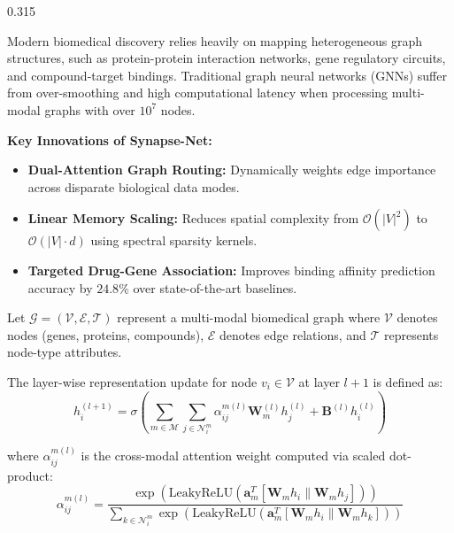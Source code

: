 \documentclass[final]{beamer}
\begin{document}
\begin{frame}[t]
\begin{columns}[t]
\begin{column}{0.315\textwidth}
    \begin{tcolorbox}[posterblock, title=\faFile\ Executive Summary]
      \large
      Modern biomedical discovery relies heavily on mapping heterogeneous graph structures, such as protein-protein interaction networks, gene regulatory circuits, and compound-target bindings. Traditional graph neural networks (GNNs) suffer from over-smoothing and high computational latency when processing multi-modal graphs with over $10^7$ nodes.

      \vspace{8pt}
      \textbf{Key Innovations of Synapse-Net:}
      \begin{itemize}
        \item \textbf{Dual-Attention Graph Routing:} Dynamically weights edge importance across disparate biological data modes.
        \item \textbf{Linear Memory Scaling:} Reduces spatial complexity from $\mathcal{O}(|V|^2)$ to $\mathcal{O}(|V| \cdot d)$ using spectral sparsity kernels.
        \item \textbf{Targeted Drug-Gene Association:} Improves binding affinity prediction accuracy by $24.8\%$ over state-of-the-art baselines.
      \end{itemize}
    \end{tcolorbox}

    \vspace{14pt}

    \begin{tcolorbox}[posterblock, title=\faLock\ Mathematical Formulation]
      \large
      Let $\mathcal{G} = (\mathcal{V}, \mathcal{E}, \mathcal{T})$ represent a multi-modal biomedical graph where $\mathcal{V}$ denotes nodes (genes, proteins, compounds), $\mathcal{E}$ denotes edge relations, and $\mathcal{T}$ represents node-type attributes.

      \vspace{6pt}
      The layer-wise representation update for node $v_i \in \mathcal{V}$ at layer $l+1$ is defined as:
      \begin{equation*}
        h_i^{(l+1)} = \sigma \left( \sum_{m \in \mathcal{M}} \sum_{j \in \mathcal{N}_i^m} \alpha_{ij}^{m(l)} \mathbf{W}_m^{(l)} h_j^{(l)} + \mathbf{B}^{(l)} h_i^{(l)} \right)
      \end{equation*}

      where $\alpha_{ij}^{m(l)}$ is the cross-modal attention weight computed via scaled dot-product:
      \begin{equation*}
        \alpha_{ij}^{m(l)} = \frac{\exp \left( \text{LeakyReLU} \left( \mathbf{a}_m^T [\mathbf{W}_m h_i \parallel \mathbf{W}_m h_j] \right) \right)}{\sum_{k \in \mathcal{N}_i^m} \exp \left( \text{LeakyReLU} \left( \mathbf{a}_m^T [\mathbf{W}_m h_i \parallel \mathbf{W}_m h_k] \right) \right)}
      \end{equation*}


\end{tcolorbox}
\end{column}
\end{columns}
\end{frame}
\end{document}
